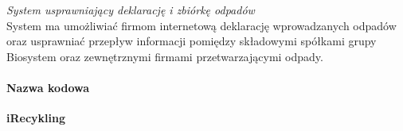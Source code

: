 

\emph{System usprawniający deklarację i zbiórkę odpadów} \\
System ma umożliwiać firmom internetową deklarację wprowadzanych odpadów oraz usprawniać przepływ informacji pomiędzy składowymi spółkami grupy Biosystem oraz zewnętrznymi firmami przetwarzającymi odpady.
\paragraph{Nazwa kodowa} \textbf{iRecykling}